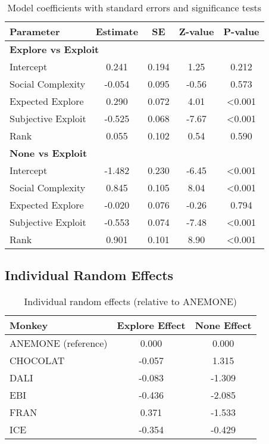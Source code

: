 \documentclass[11pt]{article}
\begin{document}
\begin{table}[h]
\centering
\begin{tabular}{lcccc}
\toprule
\textbf{Parameter} & \textbf{Estimate} & \textbf{SE} & \textbf{Z-value} & \textbf{P-value} \\
\midrule
\multicolumn{5}{l}{\textbf{Explore vs Exploit}} \\
\hline
Intercept & 0.241 & 0.194 & 1.25 & 0.212 \\
Social Complexity & -0.054 & 0.095 & -0.56 & 0.573 \\
Expected Explore & 0.290 & 0.072 & 4.01 & <0.001 \\
Subjective Exploit & -0.525 & 0.068 & -7.67 & <0.001 \\
Rank & 0.055 & 0.102 & 0.54 & 0.590 \\
\hline
\multicolumn{5}{l}{\textbf{None vs Exploit}} \\
\hline
Intercept & -1.482 & 0.230 & -6.45 & <0.001 \\
Social Complexity & 0.845 & 0.105 & 8.04 & <0.001 \\
Expected Explore & -0.020 & 0.076 & -0.26 & 0.794 \\
Subjective Exploit & -0.553 & 0.074 & -7.48 & <0.001 \\
Rank & 0.901 & 0.101 & 8.90 & <0.001 \\
\bottomrule
\end{tabular}
\caption{Model coefficients with standard errors and significance tests}
\end{table}

\subsection{Individual Random Effects}

\begin{table}[h]
\centering
\begin{tabular}{lcc}
\toprule
\textbf{Monkey} & \textbf{Explore Effect} & \textbf{None Effect} \\
\midrule
ANEMONE (reference) & 0.000 & 0.000 \\
CHOCOLAT & -0.057 & 1.315 \\
DALI & -0.083 & -1.309 \\
EBI & -0.436 & -2.085 \\
FRAN & 0.371 & -1.533 \\
ICE & -0.354 & -0.429 \\
\bottomrule
\end{tabular}
\caption{Individual random effects (relative to ANEMONE)}
\end{table}
\end{document}
